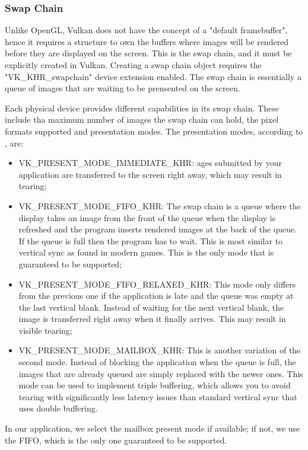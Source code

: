 \subsubsection{Swap Chain}
Unlike OpenGL, Vulkan does not have the concept of a "default framebuffer", hence it requires a structure to own the buffers where images will be rendered before they are displayed on the screen. This is the swap chain, and it must be explicitly created in Vulkan. Creating a swap chain object requires the "VK\_KHR\_swapchain" device extension enabled. The swap chain is essentially a queue of images that are waiting to be prensented on the screen.

Each physical device provides different capabilities in its swap chain. These include tha maximum number of images the swap chain can hold, the pixel formats supported and presentation modes. The presentation modes, according to \cite{vulkan_tutorial}, are:
\begin{itemize}
    \item VK\_PRESENT\_MODE\_IMMEDIATE\_KHR: ages submitted by your application are transferred to the screen right away, which may result in tearing;
    \item VK\_PRESENT\_MODE\_FIFO\_KHR: The swap chain is a queue where the display takes an image from the front of the queue when the display is refreshed and the program inserts rendered images at the back of the queue. If the queue is full then the program has to wait. This is most similar to vertical sync as found in modern games. This is the only mode that is guaranteed to be supported;
    \item VK\_PRESENT\_MODE\_FIFO\_RELAXED\_KHR: This mode only differs from the previous one if the application is late and the queue was empty at the last vertical blank. Instead of waiting for the next vertical blank, the image is transferred right away when it finally arrives. This may result in visible tearing;
    \item VK\_PRESENT\_MODE\_MAILBOX\_KHR: This is another variation of the second mode. Instead of blocking the application when the queue is full, the images that are already queued are simply replaced with the newer ones. This mode can be used to implement triple buffering, which allows you to avoid tearing with significantly less latency issues than standard vertical sync that uses double buffering.
\end{itemize}

In our application, we select the mailbox present mode if available; if not, we use the FIFO, which is the only one guaranteed to be supported.

